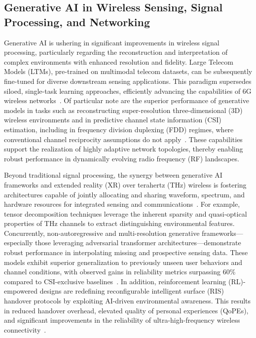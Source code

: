 \documentclass[sigconf]{acmart}
\begin{document}
\subsection{Generative AI in Wireless Sensing, Signal Processing, and Networking}

Generative AI is ushering in significant improvements in wireless signal processing, particularly regarding the reconstruction and interpretation of complex environments with enhanced resolution and fidelity. Large Telecom Models (LTMs), pre-trained on multimodal telecom datasets, can be subsequently fine-tuned for diverse downstream sensing applications. This paradigm supersedes siloed, single-task learning approaches, efficiently advancing the capabilities of 6G wireless networks~\cite{ref15,ref33}. Of particular note are the superior performance of generative models in tasks such as reconstructing super-resolution three-dimensional (3D) wireless environments and in predictive channel state information (CSI) estimation, including in frequency division duplexing (FDD) regimes, where conventional channel reciprocity assumptions do not apply~\cite{ref15,ref26,ref33}. These capabilities support the realization of highly adaptive network topologies, thereby enabling robust performance in dynamically evolving radio frequency (RF) landscapes.

Beyond traditional signal processing, the synergy between generative AI frameworks and extended reality (XR) over terahertz (THz) wireless is fostering architectures capable of jointly allocating and sharing waveform, spectrum, and hardware resources for integrated sensing and communications~\cite{ref36}. For example, tensor decomposition techniques leverage the inherent sparsity and quasi-optical properties of THz channels to extract distinguishing environmental features. Concurrently, non-autoregressive and multi-resolution generative frameworks—especially those leveraging adversarial transformer architectures—demonstrate robust performance in interpolating missing and prospective sensing data. These models exhibit superior generalization to previously unseen user behaviors and channel conditions, with observed gains in reliability metrics surpassing 60\% compared to CSI-exclusive baselines~\cite{ref36}. In addition, reinforcement learning (RL)-empowered designs are redefining reconfigurable intelligent surface (RIS) handover protocols by exploiting AI-driven environmental awareness. This results in reduced handover overhead, elevated quality of personal experiences (QoPEs), and significant improvements in the reliability of ultra-high-frequency wireless connectivity~\cite{ref36}.
\end{document}
